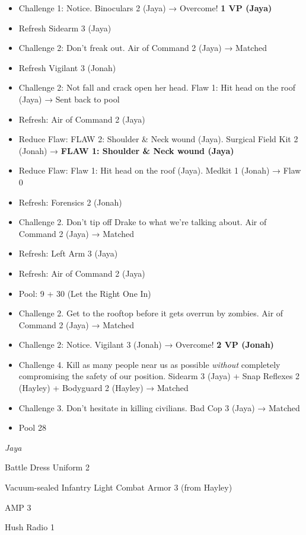 \begin{itemize}
\item Challenge 1: Notice.  Binoculars 2 (Jaya) → Overcome! \textbf{1 VP (Jaya)}
\item Refresh Sidearm 3 (Jaya)
\item Challenge 2: Don't freak out. Air of Command 2 (Jaya) → Matched
\item Refresh Vigilant 3 (Jonah)
\item Challenge 2: Not fall and crack open her head.  Flaw 1: Hit head on the roof (Jaya)\textbf{ }→ Sent back to pool
\item Refresh: Air of Command 2 (Jaya)
\item Reduce Flaw: FLAW 2: Shoulder \& Neck wound (Jaya). {\color[RGB]{255,0,0}  } Surgical Field Kit 2 (Jonah) → \textbf{ {\color[RGB]{255,0,0}FLAW 1: Shoulder \& Neck wound (Jaya)} }
\item Reduce Flaw: Flaw 1: Hit head on the roof (Jaya).  Medkit 1 (Jonah) → Flaw 0
\item Refresh: Forensics 2 (Jonah)
\item Challenge 2.  Don't tip off Drake to what we're talking about.  Air of Command 2 (Jaya) → Matched
\item Refresh: Left Arm 3 (Jaya)
\item Refresh: Air of Command 2 (Jaya)
\item Pool: 9 + 30 (Let the Right One In)
\item Challenge 2.  Get to the rooftop before it gets overrun by zombies.  Air of Command 2 (Jaya) → Matched
\item Challenge 2: Notice.  Vigilant 3 (Jonah) → Overcome! \textbf{2 VP (Jonah)}
\item Challenge 4. Kill as many people near us as possible \textit{without} completely compromising the safety of our position.  Sidearm 3 (Jaya) + Snap Reflexes 2 (Hayley) + Bodyguard 2 (Hayley) → Matched
\item Challenge 3.  Don't hesitate in killing civilians.  Bad Cop 3 (Jaya) → Matched
\item Pool 28
\end{itemize}





\textit{Jaya}

Battle Dress Uniform 2

Vacuum-sealed Infantry Light Combat Armor 3 (from Hayley)

AMP 3

Hush Radio 1

